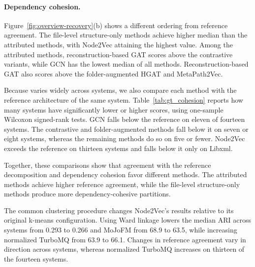 \paragraph{Dependency cohesion.} Figure~\ref{fig:overview-recovery}(b) shows a different ordering from reference agreement. The file-level structure-only methods achieve higher median \tmq{} than the attributed methods, with Node2Vec attaining the highest value. Among the attributed methods, reconstruction-based GAT scores above the contrastive variants, while GCN has the lowest median of all methods. Reconstruction-based GAT also scores above the folder-augmented HGAT and MetaPath2Vec.

Because \tmq{} varies widely across systems, we also compare each method with the reference architecture of the same system. Table~\ref{tab:gt_cohesion} reports how many systems have significantly lower or higher scores, using one-sample Wilcoxon signed-rank tests. GCN falls below the reference on eleven of fourteen systems. The contrastive and folder-augmented methods fall below it on seven or eight systems, whereas the remaining methods do so on five or fewer. Node2Vec exceeds the reference on thirteen systems and falls below it only on Libxml.

Together, these comparisons show that agreement with the reference decomposition and dependency cohesion favor different methods. The attributed methods achieve higher reference agreement, while the file-level structure-only methods produce more dependency-cohesive partitions.

The common clustering procedure changes Node2Vec's results relative to its original k-means configuration. Using Ward linkage lowers the median ARI across systems from 0.293 to 0.266 and MoJoFM from 68.9 to 63.5, while increasing normalized TurboMQ from 63.9 to 66.1. Changes in reference agreement vary in direction across systems, whereas normalized TurboMQ increases on thirteen of the fourteen systems.

